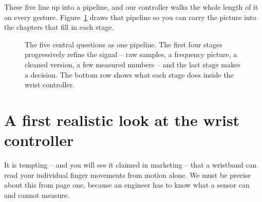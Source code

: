 These five line up into a pipeline, and our controller walks the
whole length of it on every gesture. Figure~\ref{ch01:fig-pipeline} draws that pipeline so you
can carry the picture into the chapters that fill in each stage.

\begin{figure}[H]
\centering
{}
\caption{The five central questions as one pipeline. The first four stages progressively refine
the signal -- raw samples, a frequency picture, a cleaned version, a few measured numbers -- and
the last stage makes a decision. The bottom row shows what each stage does inside the wrist
controller.}
\label{ch01:fig-pipeline}
\end{figure}

\section{A first realistic look at the wrist controller}
\label{ch01:limits}

It is tempting -- and you will see it claimed in marketing -- that a wristband can read your
individual finger movements from motion alone. We must be precise about this from page
one, because an engineer has to know what a sensor can and cannot
measure.

